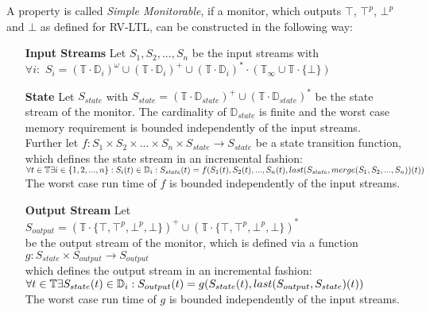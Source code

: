 		\begin{definition}
			A property is called \textit{Simple Monitorable}, if a monitor, which outputs $\top$, $\top^p$, $\bot^p$ and $\bot$ as defined for RV-LTL, can be constructed in the following way:
			\begin{itemize}
				\item[\textbf{Input Streams}]
					Let $S_1, S_2, ..., S_n$ be the input streams with\\
					$\forall i:$ $S_i=(\mathbb{T}\cdot \mathbb{D}_i)^\omega\cup(\mathbb{T}\cdot \mathbb{D}_i)^+\cup(\mathbb{T}\cdot \mathbb{D}_i)^*\cdot(\mathbb{T}_\infty\cup\mathbb{T}\cdot\{\bot\})$
				\item[\textbf{State}]
					Let $S_{state}$ with $S_{state}= (\mathbb{T}\cdot \mathbb{D}_{state})^+\cup(\mathbb{T}\cdot \mathbb{D}_{state})^*$ be the state stream of the monitor. The cardinality of $\mathbb{D}_{state}$ is finite and the worst case memory requirement is bounded independently of the input streams.\\
					Further let $f: S_1 \times S_2 \times ... \times S_n \times S_{state}\rightarrow S_{state}$ be a state transition function, which defines the state stream in an incremental fashion:\\
					\begin{math}
						\forall t\in \mathbb T \exists i\in \{1,2,...,n\}: S_i(t)\in\mathbb D_i:\\
						S_{state}(t)= f(S_1(t), S_2(t), ..., S_n(t), last(S_{state}, merge(S_1, S_2, ..., S_n))(t))
					\end{math}\\
					The worst case run time of $f$ is bounded independently of the input streams.
				\item[\textbf{Output Stream}]
					Let $S_{output}= (\mathbb{T}\cdot \{\top, \top^p, \bot^p, \bot\})^+\cup(\mathbb{T}\cdot \{\top, \top^p, \bot^p, \bot\})^*$\\
					be the output stream of the monitor, which is defined via a function\\
					$g:S_{state}\times S_{output}\rightarrow S_{output}$\\
					which defines the output stream in an incremental fashion:\\
					\begin{math}
						\forall t\in \mathbb T \exists S_{state}(t)\in\mathbb D_i:\\
						S_{output}(t)= g(S_{state}(t), last(S_{output}, S_{state})(t))
					\end{math}\\
					The worst case run time of $g$ is bounded independently of the input streams.
			\end{itemize}
		\end{definition}
